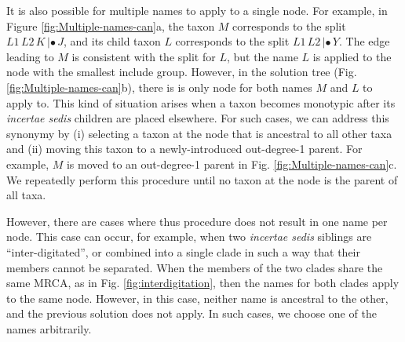 \documentclass[english]{article}
\begin{document}
It is also possible for multiple names to apply to a single node. For example,
in Figure \ref{fig:Multiple-names-can}a, the taxon $M$ corresponds to the split
$L1\,L2\,K\,|\bullet\,J$, and its child taxon $L$ corresponds to the split $L1\,L2\,|\bullet\,Y$.
The edge leading to $M$ is consistent with the split for $L$, but the name $L$ is
applied to the node with the smallest include group.
However, in the
solution tree (Fig. \ref{fig:Multiple-names-can}b), there is is only node for
both names $M$ and $L$ to apply to.
This kind of situation arises when a taxon
becomes monotypic after its \emph{incertae sedis} children are placed elsewhere.
For such cases, we can address this synonymy by (i) selecting a taxon at the
node that is ancestral to all other taxa and (ii) moving this taxon to a
newly-introduced out-degree-1 parent.  For example, $M$ is moved to an
out-degree-1 parent in Fig. \ref{fig:Multiple-names-can}c.  We repeatedly perform
this procedure until no taxon at the node is the parent of all taxa.

However, there are cases where thus procedure does not result in one name per
node.  This case can occur, for example, when two \emph{incertae sedis} siblings are 
``inter-digitated'', or  combined into a single clade in such a way that their
members cannot be separated.  When the members of the two clades share the same
MRCA, as in Fig. \ref{fig:interdigitation}, then the names for both clades
apply to the same node.  However, in this case, neither name is ancestral to
the other, and the previous solution does not apply.  In such cases, we choose
one of the names arbitrarily.
\end{document}
